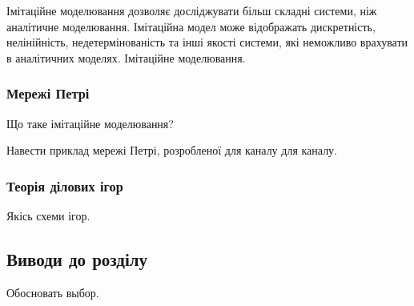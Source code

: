 Імітаційне моделювання дозволяє досліджувати більш складні системи, ніж аналітичне моделювання. Імітаційна модел може відображать дискретність, нелінійність, недетермінованість та інші якості системи, які неможливо врахувати в аналітичних моделях. Імітаційне моделювання.

\subsubsection{Мережі Петрі}
Що таке імітаційне моделювання?

Навести приклад мережі Петрі, розробленої для каналу для каналу.

\subsubsection{Теорія ділових ігор}
	Якісь схеми ігор.



\subsection{Виводи до розділу}
Обосновать выбор.
